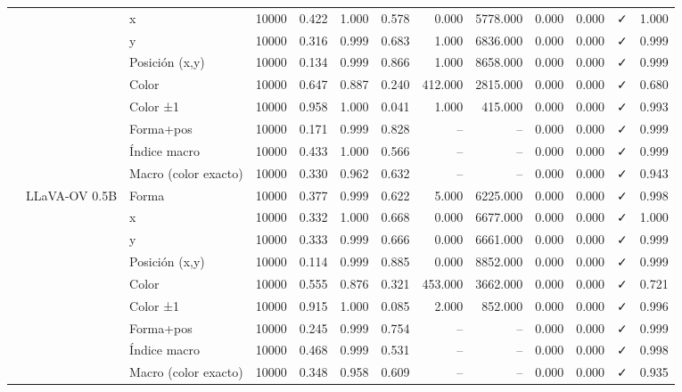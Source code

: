 \begin{tabular}{lllrrrrrrrrlr}
 &  & x & 10000 & 0.422 & 1.000 & 0.578 & 0.000 & 5778.000 & 0.000 & 0.000 & ✓ & 1.000 \\
 &  & y & 10000 & 0.316 & 0.999 & 0.683 & 1.000 & 6836.000 & 0.000 & 0.000 & ✓ & 0.999 \\
 &  & Posición (x,y) & 10000 & 0.134 & 0.999 & 0.866 & 1.000 & 8658.000 & 0.000 & 0.000 & ✓ & 0.999 \\
 &  & Color & 10000 & 0.647 & 0.887 & 0.240 & 412.000 & 2815.000 & 0.000 & 0.000 & ✓ & 0.680 \\
 &  & Color ±1 & 10000 & 0.958 & 1.000 & 0.041 & 1.000 & 415.000 & 0.000 & 0.000 & ✓ & 0.993 \\
 &  & Forma+pos & 10000 & 0.171 & 0.999 & 0.828 & -- & -- & 0.000 & 0.000 & ✓ & 0.999 \\
 &  & Índice macro & 10000 & 0.433 & 1.000 & 0.566 & -- & -- & 0.000 & 0.000 & ✓ & 0.999 \\
 &  & Macro (color exacto) & 10000 & 0.330 & 0.962 & 0.632 & -- & -- & 0.000 & 0.000 & ✓ & 0.943 \\
\cline{2-13}
 & \multirow[t]{9}{*}{LLaVA-OV 0.5B} & Forma & 10000 & 0.377 & 0.999 & 0.622 & 5.000 & 6225.000 & 0.000 & 0.000 & ✓ & 0.998 \\
 &  & x & 10000 & 0.332 & 1.000 & 0.668 & 0.000 & 6677.000 & 0.000 & 0.000 & ✓ & 1.000 \\
 &  & y & 10000 & 0.333 & 0.999 & 0.666 & 0.000 & 6661.000 & 0.000 & 0.000 & ✓ & 0.999 \\
 &  & Posición (x,y) & 10000 & 0.114 & 0.999 & 0.885 & 0.000 & 8852.000 & 0.000 & 0.000 & ✓ & 0.999 \\
 &  & Color & 10000 & 0.555 & 0.876 & 0.321 & 453.000 & 3662.000 & 0.000 & 0.000 & ✓ & 0.721 \\
 &  & Color ±1 & 10000 & 0.915 & 1.000 & 0.085 & 2.000 & 852.000 & 0.000 & 0.000 & ✓ & 0.996 \\
 &  & Forma+pos & 10000 & 0.245 & 0.999 & 0.754 & -- & -- & 0.000 & 0.000 & ✓ & 0.999 \\
 &  & Índice macro & 10000 & 0.468 & 0.999 & 0.531 & -- & -- & 0.000 & 0.000 & ✓ & 0.998 \\
 &  & Macro (color exacto) & 10000 & 0.348 & 0.958 & 0.609 & -- & -- & 0.000 & 0.000 & ✓ & 0.935 \\
\cline{1-13} \cline{2-13}
\bottomrule
\end{tabular}
